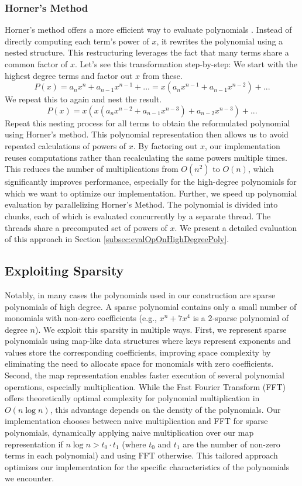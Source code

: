 \subsubsection{Horner's Method}
\label{subsec:horner}
Horner's method offers a more efficient way to evaluate polynomials \cite{horner1819xxi}. Instead of directly computing each term's power of $x$, it rewrites the polynomial using a nested structure. This restructuring leverages the fact that many terms share a common factor of $x$. Let's see this transformation step-by-step: We start with the highest degree terms and factor out $x$ from these.
$$
P(x) = a_n x^n + a_{n-1} x^{n-1} + ... = x(a_n x^{n-1} + a_{n-1} x^{n-2}) + ...
$$
We repeat this to again and nest the result.
$$
P(x) = x(x(a_n x^{n-2} + a_{n-1} x^{n-3}) + a_{n-2}x^{n-3}) + ...
$$
Repeat this nesting process for all terms to obtain the reformulated polynomial using Horner's method. This polynomial representation then allows us to avoid repeated calculations of powers of $x$. By factoring out $x$, our implementation reuses computations rather than recalculating the same powers multiple times. This reduces the number of multiplications from $O(n^2)$ to $O(n)$, which significantly improves performance, especially for the high-degree polynomials for which we want to optimize our implementation. Further, we speed up polynomial evaluation by parallelizing Horner's Method. The polynomial is divided into chunks, each of which is evaluated concurrently by a separate thread. The threads share a precomputed set of powers of $x$. We present a detailed evaluation of this approach in Section \ref{subsec:evalOpOnHighDegreePoly}.

\subsection{Exploiting Sparsity}
\label{subesec:exploitingSparsity}
Notably, in many cases the polynomials used in our construction are sparse polynomials of high degree. A sparse polynomial contains only a small number of monomials with non-zero coefficients (e.g., $x^n + 7x^4$ is a $2$-sparse polynomial of degree $n$). We exploit this sparsity in multiple ways. First, we represent sparse polynomials using map-like data structures where keys represent exponents and values store the corresponding coefficients, improving space complexity by eliminating the need to allocate space for monomials with zero coefficients. Second, the map representation enables faster execution of several polynomial operations, especially multiplication. While the Fast Fourier Transform (FFT) offers theoretically optimal complexity for polynomial multiplication in $O(n \log n)$, this advantage depends on the density of the polynomials. Our implementation chooses between naive multiplication and FFT for sparse polynomials, dynamically applying naive multiplication over our map representation if $n\log n > t_0 \cdot t_1$ (where $t_0$ and $t_1$ are the number of non-zero terms in each polynomial) and using FFT otherwise. This tailored approach optimizes our implementation for the specific characteristics of the polynomials we encounter. 

